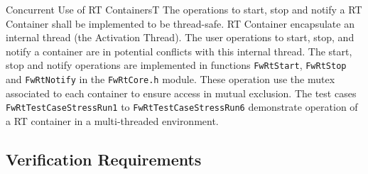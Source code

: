 \documentclass[a4paper,10pt]{article}
\newenvironment{fw_req}[6]
{\addtocounter{subsubsection}{1}
	\hspace{0.2cm}\textbf{FW-\arabic{section}.\arabic{subsection}.\arabic{subsubsection}/#2
	\hspace{0.8cm} #1}
	\vspace{-10pt}
\begin{longtable}{p{2.7cm}P{8.5cm}}
\hline
\textsc{Requirement} & #3 \\
\textsc{Justification} & #4 \\
\textsc{Implementation} & #5  \\ 
\textsc{Verification} & #6  \\
\hline
}
{\end{longtable}}
\begin{document}
\begin{fw_req}{Concurrent Use of RT Containers}{T}
{The operations to start, stop and notify a RT Container shall be implemented to be thread-safe.}
{RT Container encapsulate an internal thread (the Activation Thread). The user operations to start, stop, and notify a container are in potential conflicts with this internal thread.}
{The start, stop and notify operations are implemented in functions \texttt{FwRtStart}, \texttt{FwRtStop} and \texttt{FwRtNotify} in the \texttt{FwRtCore.h} module. These operation use the mutex associated to each container to ensure access in mutual exclusion.} 
{The test cases \texttt{FwRtTestCaseStressRun1} to \texttt{FwRtTestCaseStressRun6} demonstrate operation of a RT container in a multi-threaded environment.}
\end{fw_req}



\subsection{Verification Requirements}\label{req:verificationReqs}
\end{document}
